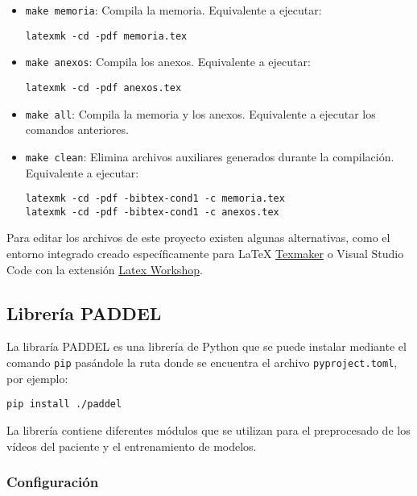 \begin{itemize}
    \item \texttt{make memoria}: Compila la memoria. Equivalente a ejecutar:
          \begin{flushleft}
              \texttt{latexmk -cd -pdf memoria.tex}
          \end{flushleft}
    \item \texttt{make anexos}: Compila los anexos. Equivalente a ejecutar:
          \begin{flushleft}
              \texttt{latexmk -cd -pdf anexos.tex}
          \end{flushleft}
    \item \texttt{make all}: Compila la memoria y los anexos. Equivalente a
          ejecutar los comandos anteriores.
    \item \texttt{make clean}: Elimina archivos auxiliares generados durante la
          compilación. Equivalente a ejecutar:
          \begin{flushleft}
              \texttt{latexmk -cd -pdf -bibtex-cond1 -c memoria.tex} \\
              \texttt{latexmk -cd -pdf -bibtex-cond1 -c anexos.tex}
          \end{flushleft}
\end{itemize}

Para editar los archivos de este proyecto existen algunas alternativas, como el
entorno integrado creado específicamente para \LaTeX{}
\href{https://www.xm1math.net/texmaker/}{Texmaker} o Visual Studio Code con la
extensión
\href{https://marketplace.visualstudio.com/items?itemName=James-Yu.latex-workshop}{Latex
    Workshop}.

\subsection{Librería PADDEL}

La libraría PADDEL es una librería de Python que se puede instalar mediante el
comando \texttt{pip} pasándole la ruta donde se encuentra el archivo
\texttt{pyproject.toml}, por ejemplo:

\texttt{pip install ./paddel}

La librería contiene diferentes módulos que se utilizan para el preprocesado de
los vídeos del paciente y el entrenamiento de modelos.

\subsubsection{Configuración}

